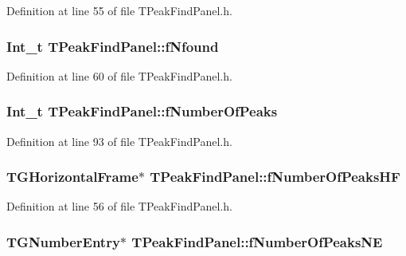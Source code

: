 Definition at line 55 of file TPeakFindPanel.h.

\subsubsection[{fNfound}]{\setlength{\rightskip}{0pt plus 5cm}Int\_\-t {\bf TPeakFindPanel::fNfound}\hspace{0.3cm}{\ttfamily  [private]}}\label{classTPeakFindPanel_accf2fd543ef0eada73fb8bb84eec599a}


Definition at line 60 of file TPeakFindPanel.h.

\subsubsection[{fNumberOfPeaks}]{\setlength{\rightskip}{0pt plus 5cm}Int\_\-t {\bf TPeakFindPanel::fNumberOfPeaks}\hspace{0.3cm}{\ttfamily  [protected]}}\label{classTPeakFindPanel_ae2305f3e528673b10dba75b633adb217}


Definition at line 93 of file TPeakFindPanel.h.

\subsubsection[{fNumberOfPeaksHF}]{\setlength{\rightskip}{0pt plus 5cm}TGHorizontalFrame$\ast$ {\bf TPeakFindPanel::fNumberOfPeaksHF}\hspace{0.3cm}{\ttfamily  [private]}}\label{classTPeakFindPanel_a2205b631e3ab0cc4ae267a4c2f94e1bf}


Definition at line 56 of file TPeakFindPanel.h.

\subsubsection[{fNumberOfPeaksNE}]{\setlength{\rightskip}{0pt plus 5cm}TGNumberEntry$\ast$ {\bf TPeakFindPanel::fNumberOfPeaksNE}\hspace{0.3cm}{\ttfamily  [private]}}\label{classTPeakFindPanel_aca4a5235670677da0ecfc79a66b88d3a}


